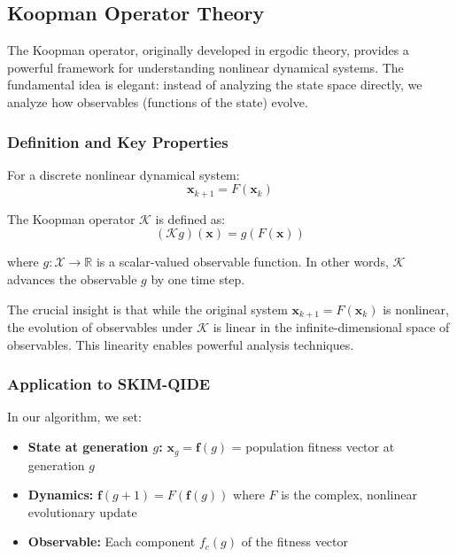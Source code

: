 \documentclass[12pt,a4paper]{article}
\begin{document}
\subsection{Koopman Operator Theory}

The Koopman operator, originally developed in ergodic theory, provides a powerful framework for understanding nonlinear dynamical systems. The fundamental idea is elegant: instead of analyzing the state space directly, we analyze how observables (functions of the state) evolve.

\subsubsection{Definition and Key Properties}

For a discrete nonlinear dynamical system:
\begin{equation}
\mathbf{x}_{k+1} = F(\mathbf{x}_k)
\end{equation}

The Koopman operator $\mathcal{K}$ is defined as:
\begin{equation}
(\mathcal{K}g)(\mathbf{x}) = g(F(\mathbf{x}))
\end{equation}

where $g: \mathcal{X} \to \mathbb{R}$ is a scalar-valued observable function. In other words, $\mathcal{K}$ advances the observable $g$ by one time step.

The crucial insight is that while the original system $\mathbf{x}_{k+1} = F(\mathbf{x}_k)$ is nonlinear, the evolution of observables under $\mathcal{K}$ is linear in the infinite-dimensional space of observables. This linearity enables powerful analysis techniques.

\subsubsection{Application to SKIM-QIDE}

In our algorithm, we set:
\begin{itemize}
  \item \textbf{State at generation $g$:} $\mathbf{x}_g = \mathbf{f}(g)$ = population fitness vector at generation $g$
  \item \textbf{Dynamics:} $\mathbf{f}(g+1) = F(\mathbf{f}(g))$ where $F$ is the complex, nonlinear evolutionary update
  \item \textbf{Observable:} Each component $f_c(g)$ of the fitness vector
\end{itemize}
\end{document}
